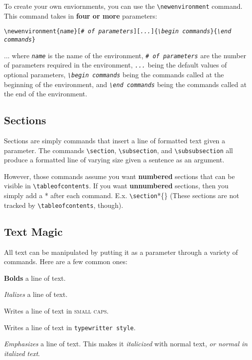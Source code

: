 To create your own enviornments, you can use the \texttt{\textbackslash newenvironment} command. This command takes in \textbf{four or more} parameters:

\begin{center}
\texttt{\textbackslash newenvironment\{\textit{name}\}[\textit{\# of parameters}][\textit{...}]\{\textit{\textbackslash begin commands}\}\{\textit{\textbackslash end commands}\}}
\end{center}

... where \texttt{\textit{name}} is the name of the environment, \texttt{\textit{\# of parameters}} are the number of parameters required in the environment, \texttt{\textit{...}} being the default values of optional parameters, \texttt{\textit{\textbackslash begin commands}} being the commands called at the beginning of the environment, and \texttt{\textit{\textbackslash end commands}} being the commands called at the end of the environment.





\subsection{Sections}
Sections are simply commands that insert a line of formatted text given a parameter. The commands \texttt{\textbackslash section}, \texttt{\textbackslash subsection}, and \texttt{\textbackslash subsubsection} all produce a formatted line of varying size given a sentence as an argument. 

However, those commands assume you want \textbf{numbered} sections that can be visible in \texttt{\textbackslash tableofcontents}. If you want \textbf{unnumbered} sections, then you simply add a * after each command. E.x. \texttt{\textbackslash section}*\{\} (These sections are not tracked by \texttt{\textbackslash tableofcontents}, though).



\subsection{Text Magic}
All text can be manipulated by putting it as a parameter through a variety of commands. Here are a few common ones:

\begin{description}
\centering
\item[\texttt{\textbackslash textbf}] \textbf{Bolds} a line of text. 
\item[\texttt{\textbackslash textit}] \textit{Italizes} a line of text. 
\item[\texttt{\textbackslash textsc}] Writes a line of text in \textsc{small caps}. 
\item[\texttt{\textbackslash texttt}] Writes a line of text in \texttt{typewritter style}. 
\item[\texttt{\textbackslash emph}] \emph{Emphasizes} a line of text. This makes it \emph{italicized} with normal text, \textit{or \emph{normal} in italized text}.
\end{description} 


